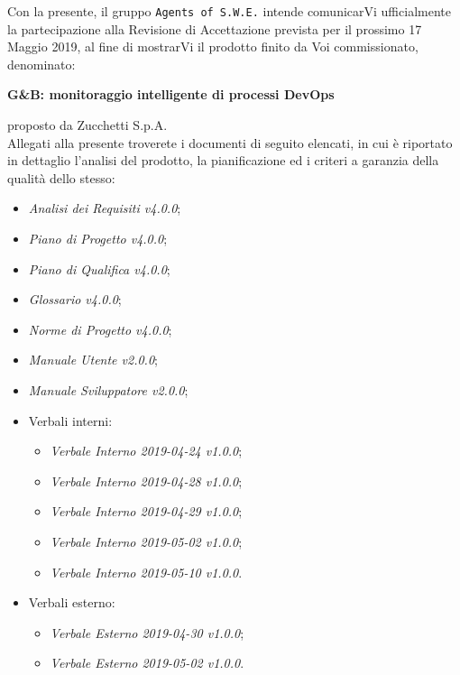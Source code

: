 \documentclass[11pt, a4paper]{letter} %
\begin{document}
\begin{letter}
		Con la presente, il gruppo \texttt{Agents of S.W.E.} intende comunicarVi ufficialmente la partecipazione alla Revisione di Accettazione prevista per il prossimo 17 Maggio 2019, al fine di mostrarVi il prodotto finito da Voi commissionato, denominato:
		\begin{center}
			\textbf{G\&B: monitoraggio intelligente di processi DevOps}
		\end{center}
		proposto da Zucchetti S.p.A.\\
		Allegati alla presente troverete i documenti di seguito elencati, in cui è riportato in dettaglio l'analisi del prodotto, la pianificazione ed i criteri a garanzia della qualità dello stesso:
		\begin{itemize}
			\item \textit{Analisi dei Requisiti v4.0.0};
			\item \textit{Piano di Progetto v4.0.0};
			\item \textit{Piano di Qualifica v4.0.0};
			\item \textit{Glossario v4.0.0};
			\item \textit{Norme di Progetto v4.0.0};	
			\item \textit{Manuale Utente v2.0.0};
			\item \textit{Manuale Sviluppatore v2.0.0};
			\item Verbali interni: 
			\begin{itemize}
				\item \textit{Verbale Interno 2019-04-24 v1.0.0};
				\item \textit{Verbale Interno 2019-04-28 v1.0.0};
				\item \textit{Verbale Interno 2019-04-29 v1.0.0};
				\item \textit{Verbale Interno 2019-05-02 v1.0.0};
				\item \textit{Verbale Interno 2019-05-10 v1.0.0}.
			\end{itemize}
			\item Verbali esterno: 
			\begin{itemize}
				\item \textit{Verbale Esterno 2019-04-30 v1.0.0};
				\item \textit{Verbale Esterno 2019-05-02 v1.0.0}.
			\end{itemize}

\end{itemize}
\end{letter}
\end{document}
